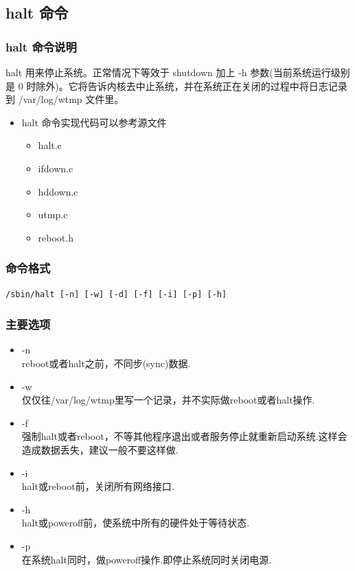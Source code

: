 \subsection{halt 命令}

\subsubsection{halt 命令说明}

halt 用来停止系统。正常情况下等效于 shutdown 加上 -h
参数(当前系统运行级别是 0
时除外)。它将告诉内核去中止系统，并在系统正在关闭的过程中将日志记录到
/var/log/wtmp 文件里。

\begin{itemize}
\item
  halt 命令实现代码可以参考源文件
  \begin{itemize}
  \item
    halt.c
  \item
    ifdown.c
  \item
    hddown.c
  \item
    utmp.c
  \item
    reboot.h
  \end{itemize}
\end{itemize}
\subsubsection{命令格式}

{\begin{shaded}\begin{verbatim}
/sbin/halt [-n] [-w] [-d] [-f] [-i] [-p] [-h]
\end{verbatim}\end{shaded}}
\subsubsection{主要选项}

\begin{itemize}
\item
  -n\\ reboot或者halt之前，不同步(sync)数据.
\item
  -w\\ 仅仅往/var/log/wtmp里写一个记录，并不实际做reboot或者halt操作.
\item
  -f\\
  强制halt或者reboot，不等其他程序退出或者服务停止就重新启动系统.这样会造成数据丢失，建议一般不要这样做.
\item
  -i\\ halt或reboot前，关闭所有网络接口.
\item
  -h\\ halt或poweroff前，使系统中所有的硬件处于等待状态.
\item
  -p\\ 在系统halt同时，做poweroff操作.即停止系统同时关闭电源.
\end{itemize}
